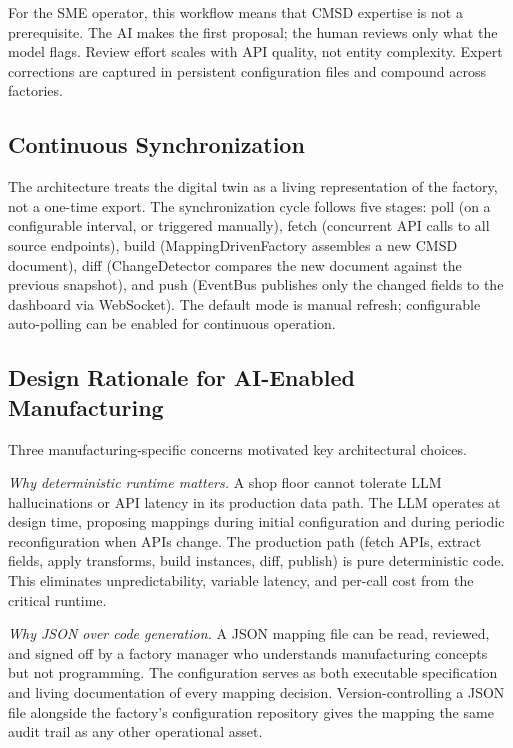 \documentclass[3p,times,procedia]{elsarticle}
\begin{document}
For the SME operator, this workflow means that CMSD expertise is not a prerequisite. The AI makes the first proposal; the human reviews only what the model flags. Review effort scales with API quality, not entity complexity. Expert corrections are captured in persistent configuration files and compound across factories.

\subsection{Continuous Synchronization}
\label{sec:arch-sync}

The architecture treats the digital twin as a living representation of the factory, not a one-time export. The synchronization cycle follows five stages: poll (on a configurable interval, or triggered manually), fetch (concurrent API calls to all source endpoints), build (MappingDrivenFactory assembles a new CMSD document), diff (ChangeDetector compares the new document against the previous snapshot), and push (EventBus publishes only the changed fields to the dashboard via WebSocket). The default mode is manual refresh; configurable auto-polling can be enabled for continuous operation.

\subsection{Design Rationale for AI-Enabled Manufacturing}
\label{sec:arch-rationale}

Three manufacturing-specific concerns motivated key architectural choices.

\textit{Why deterministic runtime matters.} A shop floor cannot tolerate LLM hallucinations or API latency in its production data path. The LLM operates at design time, proposing mappings during initial configuration and during periodic reconfiguration when APIs change. The production path (fetch APIs, extract fields, apply transforms, build instances, diff, publish) is pure deterministic code. This eliminates unpredictability, variable latency, and per-call cost from the critical runtime.

\textit{Why JSON over code generation.} A JSON mapping file can be read, reviewed, and signed off by a factory manager who understands manufacturing concepts but not programming. The configuration serves as both executable specification and living documentation of every mapping decision. Version-controlling a JSON file alongside the factory's configuration repository gives the mapping the same audit trail as any other operational asset.
\end{document}
